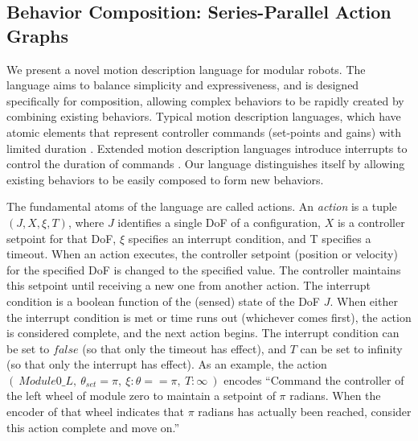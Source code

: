 \documentclass[conference]{IEEEtran}
\theoremstyle{definition}
\begin{document}
\subsection{Behavior Composition: Series-Parallel Action Graphs}
\label{sec:behavior-representation}
We present a novel motion description language for modular robots.  The
language aims to balance simplicity and expressiveness, and is designed specifically
for composition, allowing complex behaviors
to be rapidly created by combining existing behaviors. 
Typical motion description languages, which have atomic elements that represent controller
commands (set-points and gains) with limited duration \cite{brockett1988computer}.
Extended motion description languages introduce interrupts to control the duration
of commands \cite{hristu2003motion}.  Our language distinguishes itself by allowing
existing behaviors to be easily composed to form new behaviors.

 The fundamental atoms of the language are called actions.  An \textit{action} is a tuple \(
(J, X, \xi, T)\), where \(J\) identifies a single DoF of a configuration, \(X\) is a
controller setpoint for that DoF, \(\xi\) specifies an interrupt
condition, and T specifies a timeout. When an action executes, the controller
setpoint (position or velocity) for the specified DoF is changed to the specified
value. The controller maintains this setpoint until receiving a new one from another
action. The interrupt condition is a boolean function of the (sensed) state of the DoF \(J\).
When either the interrupt condition is met or time runs out (whichever comes
first), the action is considered complete, and the next action  begins. The
interrupt condition can be set to \(false\) (so that only the timeout has effect),
and \(T\) can be set to infinity (so that only the interrupt has effect). As an example,
the action \((~Module0\_L,~ \theta_{set}=\pi,~ \xi:\theta==\pi,~T:\infty~)\) encodes
``Command the controller of the left wheel of module zero to maintain a setpoint
of \(\pi\) radians.  When the encoder of that wheel indicates that \(\pi\) radians
has actually been reached, consider this action complete and move on.''
 
\end{document}
